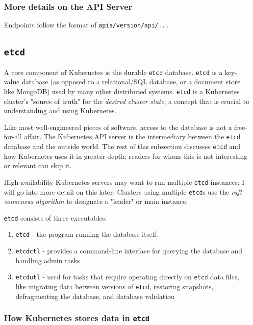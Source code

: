 \documentclass[11pt, a4paper]{article}
\begin{document}
\subsubsection{More details on the API Server}

Endpoints follow the format of \texttt{apis/{version}/{api}/...}

\subsection{\texttt{etcd}}

A core component of Kubernetes is the durable \texttt{etcd} database. \texttt{etcd} is a key-value database (as opposed to a relational/SQL database, or a document store like MongoDB) used by many other distributed systems. \texttt{etcd} is a Kubernetes cluster's "source of truth" for the \textit{desired cluster state}; a concept that is crucial to understanding and using Kubernetes. 

Like most well-engineered pieces of software, access to the database is not a free-for-all affair. The Kubernetes API server is the intermediary between the \texttt{etcd} database and the outside world. The rest of this subsection discusses \texttt{etcd} and how Kubernetes uses it in greater depth; readers for whom this is not interesting or relevant can skip it. 

High-availability Kubernetes servers may want to run multiple \texttt{etcd} instances; I will go into more detail on this later. Clusters using multiple \texttt{etcd}s use the \textit{raft consensus algorithm} to designate a "leader" or main instance. 

\texttt{etcd} consists of three executables:

\begin{enumerate}
\item \texttt{etcd} - the program running the database itself.
\item \texttt{etcdctl} - provides a command-line interface for querying the database and handling admin tasks
\item \texttt{etcdutl} - used for tasks that require operating directly on \texttt{etcd} data files, like migrating data between versions of \texttt{etcd}, restoring snapshots, defragmenting the database, and database validation
\end{enumerate}

\subsubsection{How Kubernetes stores data in \texttt{etcd}}
\end{document}
